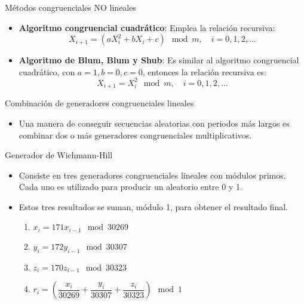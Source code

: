 \begin{frame}{Métodos congruenciales NO lineales}
    \begin{itemize}
        \item \textbf{Algoritmo congruencial cuadrático}: Emplea la relación recursiva: \begin{equation*}
            X_{i+1}=\left(aX_i^2+bX_i+c\right)\mod m, \quad i=0,1,2,\dots
        \end{equation*}
        \item \textbf{Algoritmo de Blum, Blum y Shub}: Es similar al algoritmo congruencial cuadrático, con $a=1, b=0, c=0$, entonces la relación recursiva es:
        \begin{equation*}
            X_{i+1}=X_i^2\mod m, \quad i=0,1,2,\dots
        \end{equation*}
    \end{itemize}
\end{frame}


\begin{frame}{Combinación de generadores congruenciales lineales}
    \begin{itemize}
        \item Una manera de conseguir secuencias aleatorias con periodos más largos es combinar dos o más generadores congruenciales multiplicativos.
    \end{itemize}
\end{frame}

\begin{frame}{Generador de Wichmann-Hill}
    \begin{itemize}
        \item Consiste en tres generadores congruenciales lineales con módulos primos. Cada uno es utilizado para producir un aleatorio entre 0 y 1.  
        \item Estos tres resultados se suman, módulo 1, para obtener el resultado final.
        \begin{enumerate}
            \item $x_i=171 x_{i-1} \mod 30269$
            \item $y_i=172 y_{i-1} \mod 30307$
            \item $z_i=170 z_{i-1} \mod 30323$
            \item $r_i=\left(\dfrac{x_i}{30269}+\dfrac{y_i}{30307}+\dfrac{z_i}{30323}\right)\mod 1$
        \end{enumerate}
    \end{itemize}

\end{frame}


